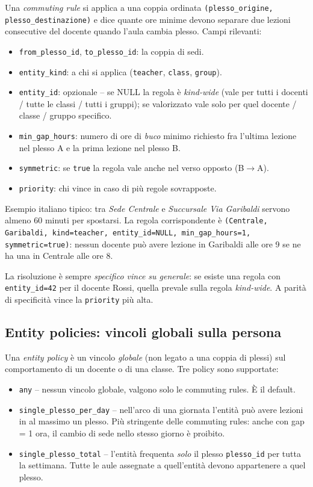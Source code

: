 Una \emph{commuting rule} si applica a una coppia ordinata
\texttt{(plesso\_origine, plesso\_destinazione)} e dice
quante ore minime devono separare due lezioni consecutive
del docente quando l'aula cambia plesso. Campi rilevanti:

\begin{itemize}
\item \texttt{from\_plesso\_id}, \texttt{to\_plesso\_id}: la
coppia di sedi.
\item \texttt{entity\_kind}: a chi si applica
(\texttt{teacher}, \texttt{class}, \texttt{group}).
\item \texttt{entity\_id}: opzionale -- se NULL la regola
\`e \emph{kind-wide} (vale per tutti i docenti / tutte le
classi / tutti i gruppi); se valorizzato vale solo per
quel docente / classe / gruppo specifico.
\item \texttt{min\_gap\_hours}: numero di ore di
\emph{buco} minimo richiesto fra l'ultima lezione nel plesso
A e la prima lezione nel plesso B.
\item \texttt{symmetric}: se \texttt{true} la regola vale
anche nel verso opposto (B$\to$A).
\item \texttt{priority}: chi vince in caso di pi\`u regole
sovrapposte.
\end{itemize}

Esempio italiano tipico: tra \emph{Sede Centrale} e
\emph{Succursale Via Garibaldi} servono almeno 60 minuti per
spostarsi. La regola corrispondente \`e
\texttt{(Centrale, Garibaldi, kind=teacher, entity\_id=NULL,
min\_gap\_hours=1, symmetric=true)}: nessun docente pu\`o
avere lezione in Garibaldi alle ore 9 se ne ha una in
Centrale alle ore 8.

La risoluzione \`e sempre \emph{specifico vince su generale}:
se esiste una regola con \texttt{entity\_id=42} per il
docente Rossi, quella prevale sulla regola
\emph{kind-wide}. A parit\`a di specificit\`a vince la
\texttt{priority} pi\`u alta.

\subsection{Entity policies: vincoli globali sulla persona}

Una \emph{entity policy} \`e un vincolo \emph{globale}
(non legato a una coppia di plessi) sul comportamento di un
docente o di una classe. Tre policy sono supportate:

\begin{itemize}
\item \texttt{any} -- nessun vincolo globale, valgono solo
le commuting rules. \`E il default.
\item \texttt{single\_plesso\_per\_day} -- nell'arco di una
giornata l'entit\`a pu\`o avere lezioni in al massimo un
plesso. Pi\`u stringente delle commuting rules: anche con
gap = 1 ora, il cambio di sede nello stesso giorno \`e
proibito.
\item \texttt{single\_plesso\_total} -- l'entit\`a frequenta
\emph{solo} il plesso \texttt{plesso\_id} per tutta la
settimana. Tutte le aule assegnate a quell'entit\`a devono
appartenere a quel plesso.
\end{itemize}

